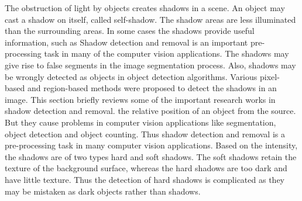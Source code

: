 {{The obstruction of light by objects creates shadows in a scene. An object may cast a 
shadow on itself, called self-shadow. The shadow areas are less illuminated than the 
surrounding areas. In some cases the shadows provide useful information, such as Shadow 
detection and removal is an important pre-processing task in many of the 
computer vision applications. The shadows may give rise to false segments in the 
image segmentation process. Also, shadows may be wrongly detected as objects in 
object detection algorithms. Various pixel-based and region-based methods were 
proposed to detect the shadows in an image. This section briefly reviews some of 
the important research works in shadow detection and removal.
the relative position of an object from the source. But they cause problems in 
computer vision applications like segmentation, object detection and object 
counting. Thus shadow detection and removal is a pre-processing task in many 
computer vision applications. Based on the intensity, the shadows are of two types
hard and soft shadows. The soft shadows retain the texture of the background 
surface, whereas the hard shadows are too dark and have little texture. Thus the 
detection of hard shadows is complicated as they may be mistaken as dark objects 
rather than shadows. 
\begin{figure}[htbp]
\centering
{}
\end{figure}}}
